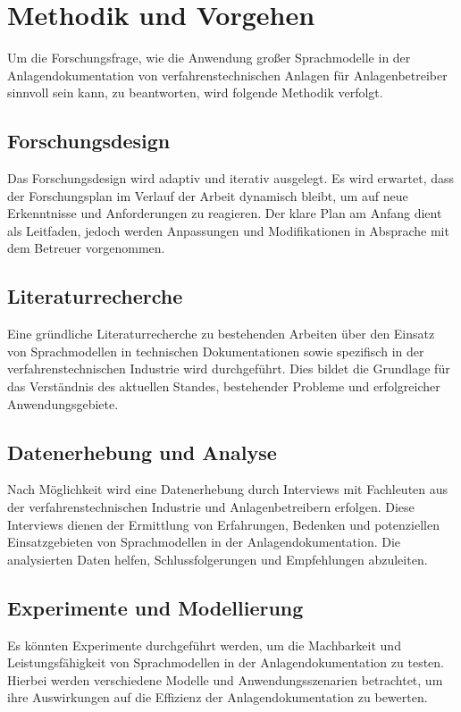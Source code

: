 \section{Methodik und Vorgehen}
\label{sec:procedure}

Um die Forschungsfrage, wie die Anwendung großer Sprachmodelle in der Anlagendokumentation von verfahrenstechnischen Anlagen für Anlagenbetreiber sinnvoll sein kann, zu beantworten, wird folgende Methodik verfolgt.

\subsection{Forschungsdesign}
Das Forschungsdesign wird adaptiv und iterativ ausgelegt. Es wird erwartet, dass der Forschungsplan im Verlauf der Arbeit dynamisch bleibt, um auf neue Erkenntnisse und Anforderungen zu reagieren. Der klare Plan am Anfang dient als Leitfaden, jedoch werden Anpassungen und Modifikationen in Absprache mit dem Betreuer vorgenommen.

\subsection{Literaturrecherche}
Eine gründliche Literaturrecherche zu bestehenden Arbeiten über den Einsatz von Sprachmodellen in technischen Dokumentationen sowie spezifisch in der verfahrenstechnischen Industrie wird durchgeführt. Dies bildet die Grundlage für das Verständnis des aktuellen Standes, bestehender Probleme und erfolgreicher Anwendungsgebiete.

\subsection{Datenerhebung und Analyse}
Nach Möglichkeit wird eine Datenerhebung durch Interviews mit Fachleuten aus der verfahrenstechnischen Industrie und Anlagenbetreibern erfolgen. Diese Interviews dienen der Ermittlung von Erfahrungen, Bedenken und potenziellen Einsatzgebieten von Sprachmodellen in der Anlagendokumentation. Die analysierten Daten helfen, Schlussfolgerungen und Empfehlungen abzuleiten.

\subsection{Experimente und Modellierung}
Es könnten Experimente durchgeführt werden, um die Machbarkeit und Leistungsfähigkeit von Sprachmodellen in der Anlagendokumentation zu testen. Hierbei werden verschiedene Modelle und Anwendungsszenarien betrachtet, um ihre Auswirkungen auf die Effizienz der Anlagendokumentation zu bewerten.

